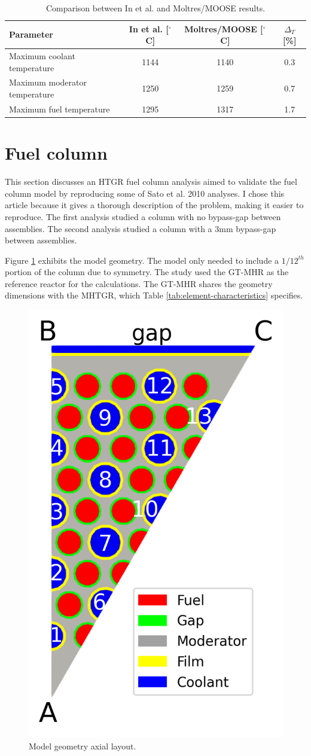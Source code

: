 \begin{table}[htbp!]
\centering
    \caption{Comparison between In et al. \cite{in_three-dimensional_2006} and Moltres/MOOSE results.}
    \label{tab:th-val-unit-results}
    \begin{tabular}{@{}l c c c}
    \toprule
  Parameter                      & In et al. [$^{\circ}$C] & Moltres/MOOSE [$^{\circ}$C] & $\Delta_T$ [\%]\\
    \midrule
  Maximum coolant temperature    & 1144      & 1140          & 0.3 \\
  Maximum moderator temperature  & 1250      & 1259          & 0.7 \\
  Maximum fuel temperature       & 1295      & 1317          & 1.7 \\
    \bottomrule
  \end{tabular}
\end{table}

\section{Fuel column}
\label{sec:fuelcol}

This section discusses an HTGR fuel column analysis aimed to validate the fuel column model by reproducing some of Sato et al. 2010 \cite{sato_computational_2010} analyses.
I chose this article because it gives a thorough description of the problem, making it easier to reproduce.
The first analysis studied a column with no bypass-gap between assemblies.
The second analysis studied a column with a 3mm bypass-gap between assemblies.

Figure \ref{fig:th-val-assem-model-a} exhibits the model geometry.
The model only needed to include a $1/12^{th}$ portion of the column due to symmetry.
The study used the GT-MHR as the reference reactor for the calculations.
The GT-MHR shares the geometry dimensions with the MHTGR, which Table \ref{tab:element-characteristics} specifies.

\begin{figure}[htbp!]
  \centering
  \includegraphics[width=0.25\linewidth]{figures-thermal/val-assem-mesh}
  \hfill
  \caption{Model geometry axial layout.}
  \label{fig:th-val-assem-model-a}
\end{figure}


